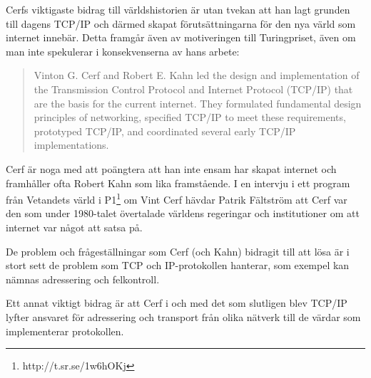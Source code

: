 \documentclass[10pt, titlepage, oneside, a4paper]{article}
\begin{document}
Cerfs viktigaste bidrag till världshistorien är utan tvekan att han lagt grunden till dagens TCP/IP och därmed skapat förutsättningarna för den nya värld som internet innebär.
Detta framgår även av motiveringen till Turingpriset, även om man inte spekulerar i konsekvenserna av hans arbete:

\begin{quotation}
Vinton G. Cerf and Robert E. Kahn led the design and implementation of the Transmission Control Protocol and Internet Protocol (TCP/IP) that are the basis for the current internet. They formulated fundamental design principles of networking, specified TCP/IP to meet these requirements, prototyped TCP/IP, and coordinated several early TCP/IP implementations.
\end{quotation}

Cerf är noga med att poängtera att han inte ensam har skapat internet och framhåller ofta Robert Kahn som lika framstående. I en intervju i ett program från Vetandets värld i P1\footnote{http://t.sr.se/1w6hOKj} om Vint Cerf hävdar Patrik Fältström att Cerf var den som under 1980-talet övertalade världens regeringar och institutioner om att internet var något att satsa på.

\vspace{7mm}


De problem och frågeställningar som Cerf (och Kahn) bidragit till att lösa är i stort sett de problem som TCP och IP-protokollen hanterar, som exempel kan nämnas adressering och felkontroll.

Ett annat viktigt bidrag är att Cerf i och med det som slutligen blev TCP/IP lyfter ansvaret för adressering och transport från olika nätverk till de värdar som implementerar protokollen.
 
\end{document}
